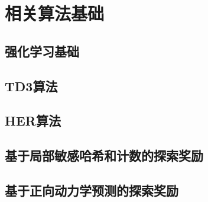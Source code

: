 \chapter{相关算法基础}

    \section{强化学习基础}

    \section{TD3算法}

    \section{HER算法}

    \section{基于局部敏感哈希和计数的探索奖励}

    \section{基于正向动力学预测的探索奖励}
